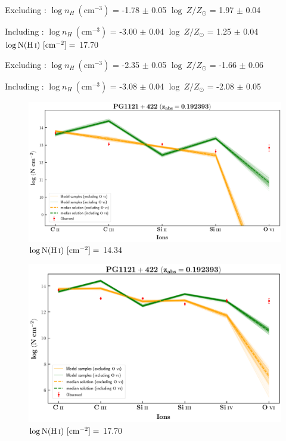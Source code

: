  Excluding  : $\log n_H \ (\text{cm}^{-3})$ = -1.78 $\pm$ 0.05 \hspace{10mm} $\log \ Z/Z_\odot$ = 1.97 $\pm$ 0.04
  
  Including  : $\log n_H \ (\text{cm}^{-3})$ = -3.00 $\pm$ 0.04 \hspace{10mm} $\log \ Z/Z_\odot$ = 1.25 $\pm$ 0.04 \\
  
  $\log \text{N}(\ion{H}{i}) \ [\text{cm}^{-2}]=$  17.70  
  
  Excluding  : $\log n_H \ (\text{cm}^{-3})$ = -2.35 $\pm$ 0.05 \hspace{10mm} $\log \ Z/Z_\odot$ = -1.66 $\pm$ 0.06
  
  Including  : $\log n_H \ (\text{cm}^{-3})$ = -3.08 $\pm$ 0.04 \hspace{10mm} $\log \ Z/Z_\odot$ = -2.08 $\pm$ 0.05 
  
  
  \newpage
  
  \begin{figure}[!h]
      \centering
      \includegraphics[width=0.85\linewidth]{Ionisation-Modelling-Plots/pg1121-z=0.192393-compI_logZ=-1.png}
      \caption{$\log \text{N}(\ion{H}{i}) \ [\text{cm}^{-2}]=$ 14.34}
  \end{figure}
  
  \begin{figure}[!b]
    \centering
    \includegraphics[width=0.85\linewidth]{Ionisation-Modelling-Plots/pg1121-z=0.192393-compII.png}
    \caption{$\log \text{N}(\ion{H}{i}) \ [\text{cm}^{-2}]=$ 17.70}
  \end{figure}
  
